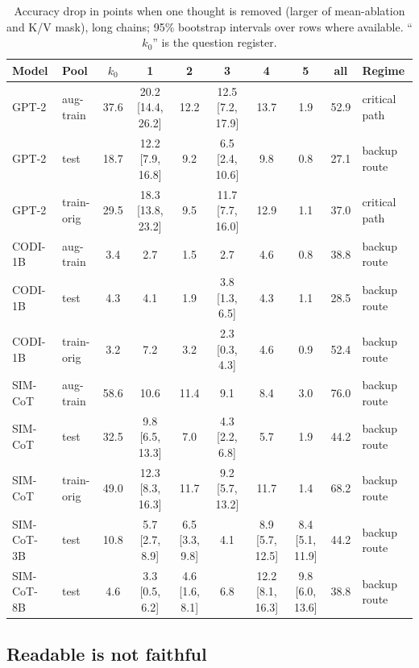 \documentclass{article}
\begin{document}
\begin{table}[h]
\caption{Accuracy drop in points when one thought is removed (larger of mean-ablation and K/V mask), long chains; 95\% bootstrap intervals over rows where available. ``$k_0$'' is the question register.}
\label{tab:necessity}
\centering
\scriptsize
\setlength{\tabcolsep}{2.5pt}
\begin{tabular}{llcccccc|c|l}
\toprule
Model & Pool & $k_0$ & 1 & 2 & 3 & 4 & 5 & all & Regime \\
\midrule
GPT-2 & aug-train & 37.6 & 20.2 [14.4, 26.2] & 12.2 & 12.5 [7.2, 17.9] & 13.7 & 1.9 & 52.9 & critical path \\
GPT-2 & test & 18.7 & 12.2 [7.9, 16.8] & 9.2 & 6.5 [2.4, 10.6] & 9.8 & 0.8 & 27.1 & backup route \\
GPT-2 & train-orig & 29.5 & 18.3 [13.8, 23.2] & 9.5 & 11.7 [7.7, 16.0] & 12.9 & 1.1 & 37.0 & critical path \\
CODI-1B & aug-train & 3.4 & 2.7 & 1.5 & 2.7 & 4.6 & 0.8 & 38.8 & backup route \\
CODI-1B & test & 4.3 & 4.1 & 1.9 & 3.8 [1.3, 6.5] & 4.3 & 1.1 & 28.5 & backup route \\
CODI-1B & train-orig & 3.2 & 7.2 & 3.2 & 2.3 [0.3, 4.3] & 4.6 & 0.9 & 52.4 & backup route \\
SIM-CoT & aug-train & 58.6 & 10.6 & 11.4 & 9.1 & 8.4 & 3.0 & 76.0 & backup route \\
SIM-CoT & test & 32.5 & 9.8 [6.5, 13.3] & 7.0 & 4.3 [2.2, 6.8] & 5.7 & 1.9 & 44.2 & backup route \\
SIM-CoT & train-orig & 49.0 & 12.3 [8.3, 16.3] & 11.7 & 9.2 [5.7, 13.2] & 11.7 & 1.4 & 68.2 & backup route \\
SIM-CoT-3B & test & 10.8 & 5.7 [2.7, 8.9] & 6.5 [3.3, 9.8] & 4.1 & 8.9 [5.7, 12.5] & 8.4 [5.1, 11.9] & 44.2 & backup route \\
SIM-CoT-8B & test & 4.6 & 3.3 [0.5, 6.2] & 4.6 [1.6, 8.1] & 6.8 & 12.2 [8.1, 16.3] & 9.8 [6.0, 13.6] & 38.8 & backup route \\
\bottomrule
\end{tabular}
\end{table}

\subsection{Readable is not faithful}\label{sec:monitors}
\end{document}

